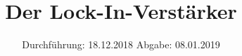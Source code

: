 

\subject{V303}
\title{Der Lock-In-Verstärker}
\date{%
  Durchführung: 18.12.2018
  \hspace{3em}
  Abgabe: 08.01.2019
}



\maketitle
\thispagestyle{empty}
\tableofcontents
\newpage







\printbibliography{}


